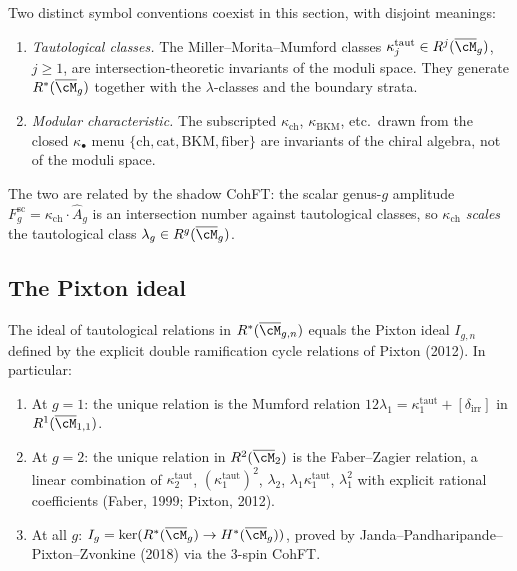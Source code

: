 \begin{definition}
\label{def:kappa-taut-vs-kappa-ch}
Two distinct symbol conventions coexist in this section, with disjoint meanings:
\begin{enumerate}[label=(\roman*)]
 \item \emph{Tautological classes.} The Miller--Morita--Mumford classes $\kappa_j^{\mathrm{taut}} \in R^j(\overline{\cM}_g)$, $j \geq 1$, are intersection-theoretic invariants of the moduli space. They generate $R^*(\overline{\cM}_g)$ together with the $\lambda$-classes and the boundary strata.
 \item \emph{Modular characteristic.} The subscripted $\kappa_{\mathrm{ch}}$, $\kappa_{\mathrm{BKM}}$, etc.\ drawn from the closed $\kappa_\bullet$ menu $\{\mathrm{ch}, \mathrm{cat}, \mathrm{BKM}, \mathrm{fiber}\}$ are invariants of the chiral algebra, not of the moduli space.
\end{enumerate}
The two are related by the shadow CohFT: the scalar genus-$g$ amplitude
$F_g^{\mathrm{sc}} = \kappa_{\mathrm{ch}} \cdot \hat{A}_g$ is an
intersection number against tautological classes, so $\kappa_{\mathrm{ch}}$
\emph{scales} the tautological class $\lambda_g \in R^g(\overline{\cM}_g)$.
\end{definition}

\subsection{The Pixton ideal}

\begin{theorem}
\label{thm:pixton-jppz}
The ideal of tautological relations in $R^*(\overline{\cM}_{g,n})$ equals the Pixton ideal $I_{g,n}$ defined by the explicit double ramification cycle relations of Pixton (2012). In particular:
\begin{enumerate}[label=(\roman*)]
 \item At $g = 1$: the unique relation is the Mumford relation $12\lambda_1 = \kappa_1^{\mathrm{taut}} + [\delta_{\mathrm{irr}}]$ in $R^1(\overline{\cM}_{1,1})$.
 \item At $g = 2$: the unique relation in $R^2(\overline{\cM}_2)$ is the Faber--Zagier relation, a linear combination of $\kappa_2^{\mathrm{taut}}$, $(\kappa_1^{\mathrm{taut}})^2$, $\lambda_2$, $\lambda_1 \kappa_1^{\mathrm{taut}}$, $\lambda_1^2$ with explicit rational coefficients (Faber, 1999; Pixton, 2012).
 \item At all $g$: $I_g = \ker(R^*(\overline{\cM}_g) \to H^*(\overline{\cM}_g))$, proved by Janda--Pandharipande--Pixton--Zvonkine (2018) via the $3$-spin CohFT.
\end{enumerate}
\end{theorem}

